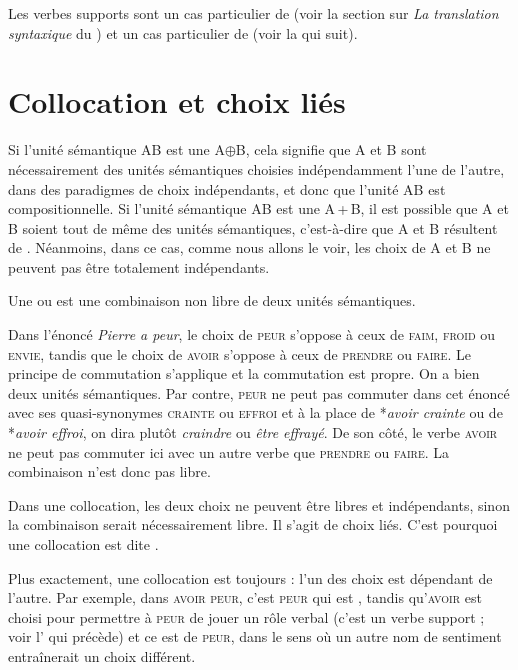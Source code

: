{    Les verbes supports sont un cas particulier de  (voir la section sur \textit{La translation syntaxique} du ) et un cas particulier de  (voir la  qui suit).
}
\section{Collocation et choix liés}\label{sec:2.3.10}%

Si l’unité sémantique AB est une  A${\oplus}$B, cela signifie que A et B sont nécessairement des unités sémantiques choisies indépendamment l’une de l’autre, dans des paradigmes de choix indépendants, et donc que l’unité AB est compositionnelle. Si l’unité sémantique AB est une  A\,+\,B, il est possible que A et B soient tout de même des unités sémantiques, c’est-à-dire que A et B résultent de . Néanmoins, dans ce cas, comme nous allons le voir, les choix de A et B ne peuvent pas être totalement indépendants.

{Une  ou  est une combinaison non libre de deux unités sémantiques.}

Dans l’énoncé \textit{Pierre a peur}, le choix de \textsc{peur} s’oppose à ceux de \textsc{faim,} \textsc{froid} ou \textsc{envie}, tandis que le choix de \textsc{avoir} s’oppose à ceux de \textsc{prendre} ou \textsc{faire}. Le principe de commutation s’applique et la commutation est propre. On a bien deux unités sémantiques. Par contre, \textsc{peur} ne peut pas commuter dans cet énoncé avec ses quasi-synonymes \textsc{crainte} ou \textsc{effroi} et à la place de *\textit{avoir crainte} ou de *\textit{avoir effroi}, on dira plutôt \textit{craindre} ou \textit{être effrayé}. De son côté, le verbe \textsc{avoir} ne peut pas commuter ici avec un autre verbe que \textsc{prendre} ou \textsc{faire}. La combinaison n’est donc pas libre.

{Dans une collocation, les deux choix ne peuvent être libres et indépendants, sinon la combinaison serait nécessairement libre. Il s’agit de choix liés. C’est pourquoi une collocation est dite .}

Plus exactement, une collocation est toujours : l’un des choix est dépendant de l’autre. Par exemple, dans \textsc{avoir} \textsc{peur}, c’est \textsc{peur} qui est , tandis qu’\textsc{avoir} est choisi pour permettre à \textsc{peur} de jouer un rôle verbal (c’est un verbe support ; voir l’ qui précède) et ce  est  de \textsc{peur}, dans le sens où un autre nom de sentiment entraînerait un choix différent.

